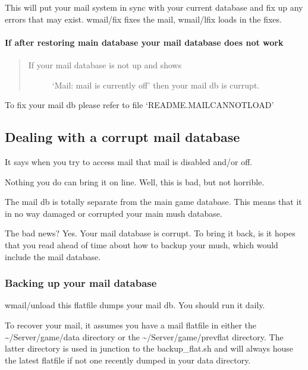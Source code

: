 \documentclass[letterpaper,10pt,english]{sphinxmanual}
\begin{document}
\sphinxAtStartPar
This will put your mail system in sync with your current database and
fix up any errors that may exist.  wmail/fix fixes the mail, wmail/lfix
loads in the fixes.


\paragraph{If after restoring main database your mail database does not work}
\label{\detokenize{troubleshooting:if-after-restoring-main-database-your-mail-database-does-not-work}}\begin{quote}
\begin{description}
\item[{If your mail database is not up and shows}] \leavevmode
\sphinxAtStartPar
‘Mail: mail is currently off’ then your mail db is currupt.

\end{description}
\end{quote}

\sphinxAtStartPar
To fix your mail db please refer to file ‘README.MAILCANNOTLOAD’


\subsection{Dealing with a corrupt mail database}
\label{\detokenize{troubleshooting:dealing-with-a-corrupt-mail-database}}
\sphinxAtStartPar
It says when you try to access mail that mail is disabled and/or off.

\sphinxAtStartPar
Nothing you do can bring it on line.  Well, this is bad, but not horrible.

\sphinxAtStartPar
The mail db is totally separate from the main game database.  This means
that it in no way damaged or corrupted your main mush database.

\sphinxAtStartPar
The bad news?  Yes.  Your mail database is corrupt.  To bring it back,
is it hopes that you read ahead of time about how to backup your mush,
which would include the mail database.


\subsubsection{Backing up your mail database}
\label{\detokenize{troubleshooting:backing-up-your-mail-database}}
\sphinxAtStartPar
wmail/unload \textendash{} this flatfile dumps your mail db.  You should run it daily.

\sphinxAtStartPar
To recover your mail, it assumes you have a mail flatfile in either the
\textasciitilde{}/Server/game/data directory or the \textasciitilde{}/Server/game/prevflat directory.  The
latter directory is used in junction to the backup\_flat.sh and will always
house the latest flatfile if not one recently dumped in your data directory.
\end{document}
